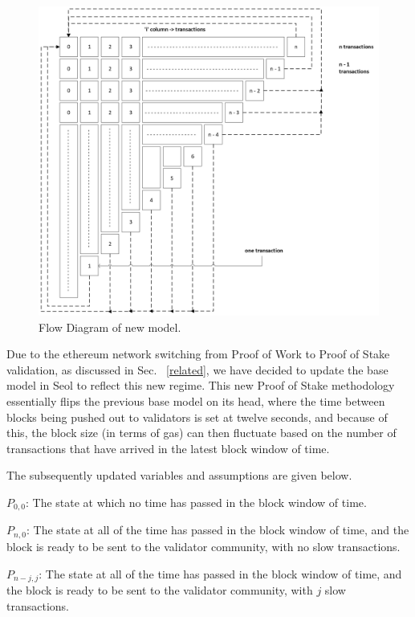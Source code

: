 \documentclass[conference]{IEEEtran}
\begin{document}
\begin{figure}[htbp]
    \centerline{\includegraphics[width=\textwidth]{Figures/FlowDiagram.png}}
    \caption{Flow Diagram of new model.} 
    \label{flow}
\end{figure}	

Due to the ethereum network switching from Proof of Work to Proof of
Stake validation, as discussed in Sec. ~\ref{related}, we have decided to update
the base model in Seol\cite{2020_ACM_Seol} to reflect this new regime. This 
new Proof of Stake methodology essentially flips the previous base model on its 
head, where the time between blocks being pushed out to validators is set at twelve 
seconds, and because of this, the block size (in terms of gas) can then fluctuate based 
on the number of transactions that have arrived in the latest block window of time. 

The subsequently updated variables and assumptions are given below. 

$P_{0,0}$: The state at which no time has passed in the block window of time. 

$P_{n,0}$: The state at all of the time has passed in the block window of time, and
the block is ready to be sent to the validator community, with no slow transactions. 

$P_{n-j,j}$: The state at all of the time has passed in the block window of time, and
the block is ready to be sent to the validator community, with $j$ slow transactions. 
\end{document}
